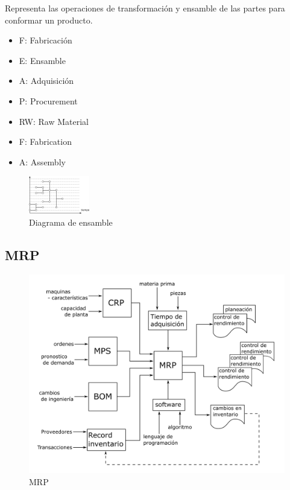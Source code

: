 Representa las operaciones de transformación y ensamble de las partes para conformar un producto. 
\begin{itemize}
    \item F: Fabricación
    \item E: Ensamble
    \item A: Adquisición
    \item P: Procurement
    \item RW: Raw Material
    \item F: Fabrication
    \item A: Assembly
\end{itemize}

\begin{figure}[h!]
    \centering
        \includegraphics[scale=0.25]{Manufactura Integrada por Computadora Figuras/Figura06 Diagrama de Ensamble.png}
        \caption{Diagrama de ensamble}
\end{figure}

\subsection{MRP}
\begin{figure}[h!]
    \centering
        \includegraphics[scale=0.15]{Manufactura Integrada por Computadora Figuras/Figura07 MRP.png}
        \caption{MRP}
\end{figure}
